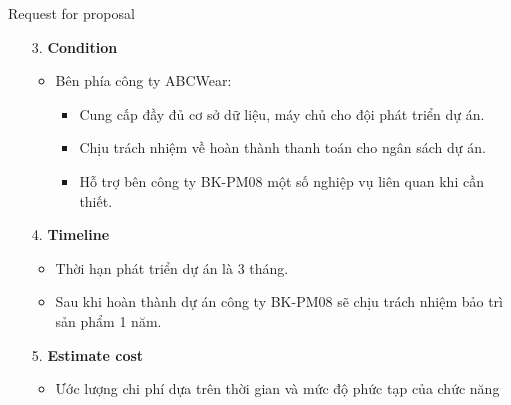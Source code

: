 \documentclass[compress]{beamer}
\begin{document}
\begin{frame}{Request for proposal}
\begin{itemize}
\item[3. ] \textbf{Condition}
\begin{itemize}
\item Bên phía công ty ABCWear:
\begin{itemize}
\item Cung cấp đầy đủ cơ sở dữ liệu, máy chủ cho đội phát triển dự án.
\item Chịu trách nhiệm về hoàn thành thanh toán cho ngân sách dự án.
\item Hỗ trợ bên công ty BK-PM08 một số nghiệp vụ liên quan khi cần thiết.
\end{itemize}
\end{itemize}
\item[4. ] \textbf{Timeline}
\begin{itemize}
\item Thời hạn phát triển dự án là 3 tháng.
\item Sau khi hoàn thành dự án công ty BK-PM08 sẽ chịu trách nhiệm bảo trì sản phẩm 1 năm.
\end{itemize}
\item[5. ] \textbf{Estimate cost}
\begin{itemize}
\item Ước lượng chi phí dựa trên thời gian và mức độ phức tạp của chức năng
\end{itemize}
\end{itemize}
\end{frame}
\end{document}

